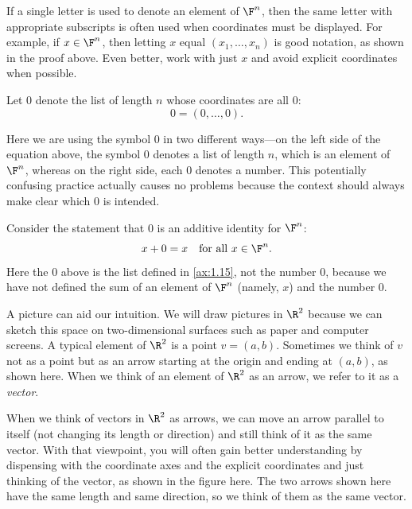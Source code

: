 %
If a single letter is used to denote an element of $\F^n$, then the same letter
with appropriate subscripts is often used when coordinates must be displayed.
For example, if $x\in\F^n$, then letting $x$ equal $(x_1,\dots,x_n)$ is good
notation, as shown in the proof above. Even better, work with just $x$ and
avoid explicit coordinates when possible.

\begin{notation}[$0$]\label{ax:1.15}
Let $0$ denote the list of length $n$ whose coordinates are all $0$:
\[ 0 = (0,\dots,0). \]
\end{notation}

Here we are using the symbol $0$ in two different ways---on the left side of
the equation above, the symbol $0$ denotes a list of length $n$, which is an
element of $\F^n$, whereas on the right side, each $0$ denotes a number. This
potentially confusing practice actually causes no problems because the context
should always make clear which $0$ is intended.

\begin{example}\label{ax:1.16}
Consider the statement that $0$ is an additive identity for $\F^n$:
\[ x+0=x \quad\text{for all } x\in\F^n. \]
Here the $0$ above is the list defined in \ref{ax:1.15}, not the number $0$,
because we have not defined the sum of an element of $\F^n$ (namely, $x$) and
the number $0$.
\end{example}

%
A picture can aid our intuition. We will draw pictures in $\R^2$ because we can
sketch this space on two-dimensional surfaces such as paper and computer
screens. A typical element of $\R^2$ is a point $v=(a,b)$. Sometimes we think
of $v$ not as a point but as an arrow starting at the origin and ending at
$(a,b)$, as shown here. When we think of an element of $\R^2$ as an arrow, we
refer to it as a \emph{vector}.

%
When we think of vectors in $\R^2$ as arrows, we can move an arrow parallel to
itself (not changing its length or direction) and still think of it as the same
vector. With that viewpoint, you will often gain better understanding by
dispensing with the coordinate axes and the explicit coordinates and just
thinking of the vector, as shown in the figure here. The two arrows shown here
have the same length and same direction, so we think of them as the same
vector.

